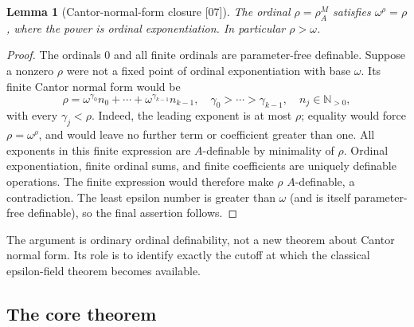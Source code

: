 \documentclass[11pt,a4paper]{article}
\numberwithin{equation}{section}
\newtheorem{lemma}[lemma]{Lemma}
\theoremstyle{definition}
\theoremstyle{remark}
\newcommand{\N}{\mathbb N}
\newcommand{\src}[1]{\textup{\textsf{\small[#1]}}}
\begin{document}
\begin{lemma}[Cantor-normal-form closure \src{07}]\label{dsn:lem:rho-epsilon}
The ordinal $\rho=\rho^M_A$ satisfies $\omega^\rho=\rho$, where the power
is ordinal exponentiation. In particular $\rho>\omega$.
\end{lemma}
\begin{proof}
The ordinals $0$ and all finite ordinals are parameter-free definable.
Suppose a nonzero $\rho$ were not a fixed point of ordinal exponentiation
with base $\omega$. Its finite Cantor normal form would be
\[
 \rho=\omega^{\gamma_0}n_0+\cdots+\omega^{\gamma_{k-1}}n_{k-1},
 \quad \gamma_0>\cdots>\gamma_{k-1},\quad n_j\in\N_{>0},
\]
with every $\gamma_j<\rho$. Indeed, the leading exponent is at most
$\rho$; equality would force $\rho=\omega^\rho$, and would leave no further
term or coefficient greater than one. All exponents in this finite
expression are $A$-definable by minimality of $\rho$. Ordinal
exponentiation, finite ordinal sums, and finite coefficients are uniquely
definable operations. The finite expression would therefore make $\rho$
$A$-definable, a contradiction. The least epsilon number is greater than
$\omega$ (and is itself parameter-free definable), so the final assertion
follows.
\end{proof}

The argument is ordinary ordinal definability, not a new theorem about
Cantor normal form. Its role is to identify exactly the cutoff at which the
classical epsilon-field theorem becomes available.

\subsection{The core theorem}
\end{document}
